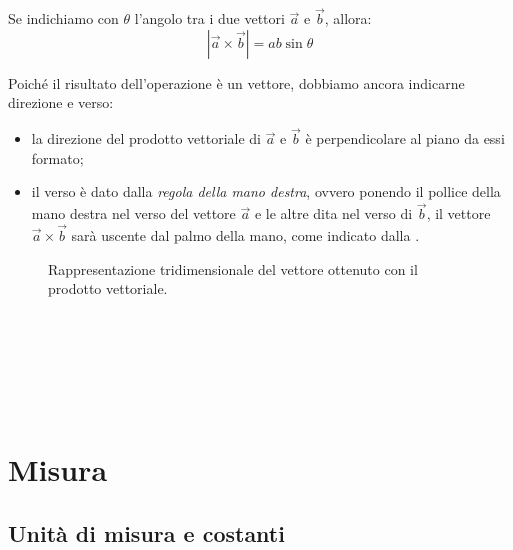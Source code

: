 \documentclass[a4paper,11pt,italian]{article}
\begin{document}
\begin{description}
  Se indichiamo con $ \theta $ l'angolo tra i due vettori $ \vec{a} $ e $ \vec{b} $, allora: 
  \[ | \vec{a} \times \vec{b} | = ab\sin\theta \]

  Poiché il risultato dell'operazione è un vettore, dobbiamo ancora indicarne direzione e verso:
  \begin{itemize}
    \item la direzione del prodotto vettoriale di $ \vec{a} $ e $ \vec{b} $ è perpendicolare al piano da essi formato;
    \item il verso è dato dalla \emph{regola della mano destra}, ovvero ponendo il pollice della mano destra nel verso del vettore $ \vec{a} $ e le altre dita nel verso di $ \vec{b} $, il vettore $ \vec{a} \times \vec{b} $ sarà uscente dal palmo della mano, come indicato dalla .
  \end{itemize}
  
\begin{figure}[htb]\centering
{}\caption{Rappresentazione tridimensionale del vettore ottenuto con il prodotto vettoriale.}
\label{img:vettoriale2}
\end{figure}
~\\~\\~\\~\\~
\end{description}

\newpage
\section{Misura}

\subsection{Unità di misura e costanti}
\end{document}
